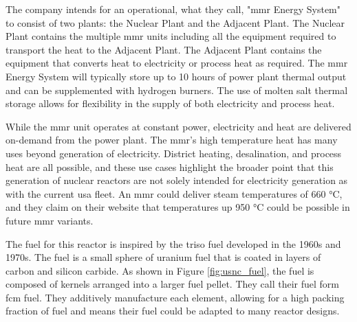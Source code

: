 The company intends for an operational, what they call, "\gls{mmr} Energy System" to consist of two plants: the Nuclear Plant and the Adjacent Plant. The Nuclear Plant contains the multiple \gls{mmr} units including all the equipment required to transport the heat to the Adjacent Plant. The Adjacent Plant contains the equipment that converts heat to electricity or process heat as required. The \gls{mmr} Energy System will typically store up to 10 hours of power plant thermal output and can be supplemented with hydrogen burners. The use of molten salt thermal storage allows for flexibility in the supply of both electricity and process heat.

While the \gls{mmr} unit operates at constant power, electricity and heat are delivered on-demand from the power plant. The \gls{mmr}'s high temperature heat has many uses beyond generation of electricity. District heating, desalination, and process heat are all possible, and these use cases highlight the broader point that this generation of nuclear reactors are not solely intended for electricity generation as with the current \gls{usa} fleet. An \gls{mmr} could deliver steam temperatures of 660 °C, and they claim on their website that temperatures up 950 °C could be possible in future \gls{mmr} variants.

The fuel for this reactor is inspired by the \gls{triso} fuel developed in the 1960s and 1970s. The fuel is a small sphere of uranium fuel that is coated in layers of carbon and silicon carbide. As shown in Figure \ref{fig:usnc_fuel}, the fuel is composed of kernels arranged into a larger fuel pellet. They call their fuel form \gls{fcm} fuel. They additively manufacture each element, allowing for a high packing fraction of fuel and means their fuel could be adapted to many reactor designs.

